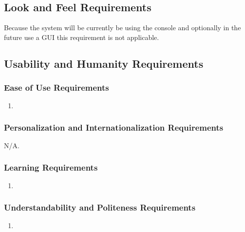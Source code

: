 \documentclass[12pt, titlepage]{article}
\begin{document}
\subsection{Look and Feel Requirements}
    Because the system will be currently be using the console and optionally in the future use a GUI this requirement is not applicable. 
\subsection{Usability and Humanity Requirements}
    \subsubsection{Ease of Use Requirements}
        \label{ssub:ease_of_use_requirements}
        \begin{enumerate}[label=UH\arabic*.]
        	\item 
        \end{enumerate}
        
        \subsubsection{Personalization and Internationalization Requirements}
        \label{ssub:personalization_and_internationalization_requirements}
        N/A.
        
        \subsubsection{Learning Requirements}
        \label{ssub:learning_requirements}
        \begin{enumerate}[label=UH\arabic*.]
        	\item 
        \end{enumerate}
        
        \subsubsection{Understandability and Politeness Requirements}
        \label{ssub:understandability_and_politeness_requirements}
        \begin{enumerate}[label=UH\arabic*.]
        	\item 
        \end{enumerate}
        
\end{document}
